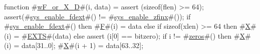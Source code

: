 function #\hyperref[sailRISCVzwFzyorzyXzyD]{wF\_or\_X\_D}#(i, data) = {
  assert (sizeof(flen) >= 64);
  assert(#\hyperref[sailRISCVzsyszyenablezyfdext]{sys\_enable\_fdext}#() != #\hyperref[sailRISCVzsyszyenablezyzzfinx]{sys\_enable\_zfinx}#());
  if   #\hyperref[sailRISCVzsyszyenablezyfdext]{sys\_enable\_fdext}#()
  then #\hyperref[sailRISCVzF]{F}#(i) = data
  else if sizeof(xlen) >= 64
  then #\hyperref[sailRISCVzX]{X}#(i) = #\hyperref[sailRISCVzEXTS]{EXTS}#(data)
  else {
    assert (i[0] == bitzero);
    if i != #\hyperref[sailRISCVzzzeros]{zeros}#() then {
      #\hyperref[sailRISCVzX]{X}#(i)     = data[31..0];
      #\hyperref[sailRISCVzX]{X}#(i + 1) = data[63..32];
    }
  }
}
